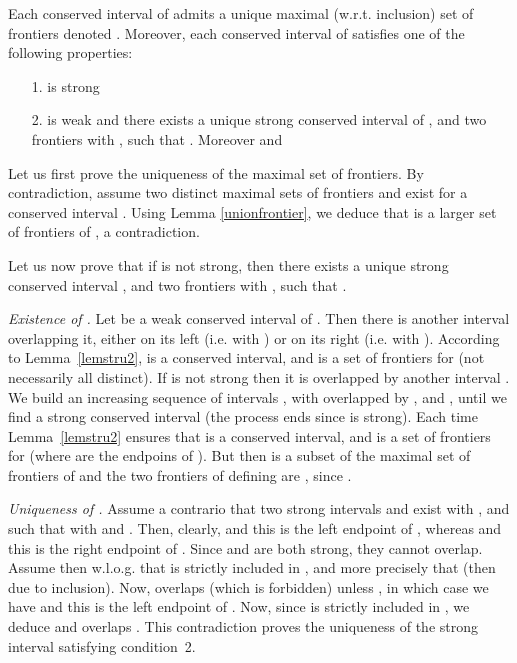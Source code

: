\documentclass{article}
\begin{document}
\begin{theorem}
\label{theostruc2}
Each conserved interval  of  admits a unique maximal
(w.r.t. inclusion) set of frontiers denoted .
Moreover, each conserved
interval  of  satisfies one of the following
properties:
\begin{itemize}
\item[1.]  is strong
\item[2.]  is weak and there exists a unique strong conserved interval  of
  , and two frontiers  with , such that
  . Moreover   and 
\end{itemize}
\end{theorem}

\begin{preuve}
Let us first prove the uniqueness of the maximal set of frontiers. By contradiction, assume
two distinct maximal sets of frontiers  and  exist
for a conserved interval  . Using Lemma \ref{unionfrontier}, we deduce that 
 is a larger set of frontiers of , a contradiction.

Let us now prove that if  is not strong, then  there exists a unique strong conserved interval
, and two frontiers  with , such that .

{\em Existence of .} Let  be a weak conserved interval of .
Then there is another interval  overlapping it, either on its left
(i.e.  with )
or on its right (i.e.  with ). According to Lemma~\ref{lemstru2},  is a
conserved interval, and  is a set of frontiers
for  (not necessarily all distinct). If  is not strong then it is overlapped by
another interval .  We build an increasing sequence of intervals
, with  overlapped by , and
, until we find a strong conserved
interval  (the process ends since  is strong). Each time
Lemma~\ref{lemstru2} ensures that  is a conserved interval,
and  is a set of frontiers for 
(where  are the 
endpoins of  ). But then  is a subset of the maximal set of
frontiers  of  and the two frontiers of   defining
 are , since . 




{\em Uniqueness of .} Assume a contrario that two strong intervals  and  exist with
,  and
such that  with  and
.  Then, clearly,  and this is the left
endpoint of , whereas  and this is the right endpoint of
.  Since  and  are both strong, they cannot
overlap. Assume then w.l.o.g. that  is strictly included in
, and more precisely that  (then  due to
inclusion). Now,  overlaps  (which is forbidden) unless , in which
case we have  and this is the left endpoint of . Now,
since  is strictly included in , we deduce  and
 overlaps . This contradiction proves the
uniqueness of the strong interval  satisfying condition~2.


\end{preuve}
\end{document}
